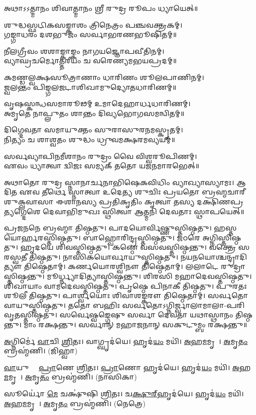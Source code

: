 
𑌅𑌥𑌾𑌽𑌽𑌤𑍍𑌮𑌾𑌨𑌂 𑌶𑌿𑌵𑌾𑌤𑍍𑌮𑌾𑌨𑌂 𑌶𑍍𑌰𑍀 𑌰𑍁𑌦𑍍𑌰 𑌰𑍂𑌪𑌂 𑌧𑍍𑌯𑌾𑌯𑍇𑌤𑍍॥

𑌶𑍁𑌦𑍍𑌧𑌸𑍍𑌫𑌟𑌿𑌕𑌸𑌙𑍍𑌕𑌾𑌶𑌂 𑌤𑍍𑌰𑌿𑌨𑍇𑌤𑍍𑌰𑌂 𑌪𑌞𑍍𑌚𑌵𑌕𑍍𑌤𑍍𑌰𑌕𑌮𑍍।\\
𑌗𑌙𑍍𑌗𑌾𑌧𑌰𑌂 𑌦𑌶𑌭𑍁𑌜𑌂 𑌸𑌰𑍍𑌵𑌾𑌭𑌰𑌣𑌭𑍂𑌷𑌿𑌤𑌮𑍍॥

𑌨𑍀𑌲𑌗𑍍𑌰𑍀𑌵𑌂 𑌶𑌶𑌾𑌙𑍍𑌕𑌾𑌙𑍍𑌕𑌂 𑌨𑌾𑌗𑌯𑌜𑍍𑌞𑍋𑌪𑌵𑍀𑌤𑌿𑌨𑌮𑍍।\\
𑌵𑍍𑌯𑌾𑌘𑍍𑌰𑌚𑌰𑍍𑌮𑍋𑌤𑍍𑌤𑌰𑍀𑌯𑌂 𑌚 𑌵𑌰𑍇𑌣𑍍𑌯𑌮𑌭𑌯𑌪𑍍𑌰𑌦𑌮𑍍॥

𑌕𑌮𑌣𑍍𑌡𑌲𑍍𑌵𑌕𑍍𑌷𑌸𑍂𑌤𑍍𑌰𑌾𑌣𑌾𑌂 𑌧𑌾𑌰𑌿𑌣𑌂 𑌶𑍂𑌲𑌪𑌾𑌣𑌿𑌨𑌮𑍍।\\
𑌜𑍍𑌵𑌲𑌨𑍍𑌤𑌂 𑌪𑌿𑌙𑍍𑌗𑌲𑌜𑌟𑌾𑌶𑌿𑌖𑌾𑌮𑍁𑌦𑍍𑌯𑍋𑌤𑌧𑌾𑌰𑌿𑌣𑌮𑍍॥

𑌵𑍃𑌷𑌸𑍍𑌕𑌨𑍍𑌧𑌸𑌮𑌾𑌰𑍂𑌢𑌮𑍍 𑌉𑌮𑌾𑌦𑍇𑌹𑌾𑌰𑍍𑌧𑌧𑌾𑌰𑌿𑌣𑌮𑍍।\\
𑌅𑌮𑍃𑌤𑍇  𑌨𑌾𑌪𑍍𑌲𑍁𑌤𑌂 𑌶𑌾𑌨𑍍𑌤𑌂 𑌦𑌿𑌵𑍍𑌯𑌭𑍋𑌗𑌸𑌮𑌨𑍍𑌵𑌿𑌤𑌮𑍍॥

𑌦𑌿𑌗𑍍𑌦𑍇𑌵𑌤𑌾 𑌸𑌮𑌾𑌯𑍁𑌕𑍍𑌤𑌂 𑌸𑍁𑌰𑌾𑌸𑍁𑌰𑌨𑌮𑌸𑍍𑌕𑍃𑌤𑌮𑍍।\\
𑌨𑌿𑌤𑍍𑌯𑌂 𑌚 𑌶𑌾𑌶𑍍𑌵𑌤𑌂 𑌶𑍁𑌦𑍍𑌧𑌂 𑌧𑍍𑌰𑍁𑌵𑌮𑌕𑍍𑌷𑌰𑌮𑌵𑍍𑌯𑌯𑌮𑍍॥

𑌸𑌰𑍍𑌵𑌵𑍍𑌯𑌾𑌪𑌿𑌨𑌮𑍀𑌶𑌾𑌨𑌂 𑌰𑍁𑌦𑍍𑌰𑌂 𑌵𑍈 𑌵𑌿𑌶𑍍𑌵𑌰𑍂𑌪𑌿𑌣𑌮𑍍।\\
𑌏𑌵𑌂 𑌧𑍍𑌯𑌾𑌤𑍍𑌵𑌾 𑌦𑍍𑌵𑌿𑌜𑌃 𑌸𑌮𑍍𑌯𑌕𑍍 𑌤𑌤𑍋 𑌯𑌜𑌨𑌮𑌾𑌰𑌭𑍇𑌤𑍍॥

𑌅𑌥𑌾𑌤𑍋 𑌰𑍁𑌦𑍍𑌰 𑌸𑍍𑌨𑌾𑌨𑌾𑌰𑍍𑌚𑌨𑌾𑌭𑌿𑌷𑍇𑌕𑌵𑌿𑌧𑌿𑌂 𑌵𑍍𑌯𑌾𑌖𑍍𑌯𑌾𑌸𑍍𑌯𑌾𑌮𑌃। 𑌆𑌦𑌿𑌤 𑌏𑌵 𑌤𑍀𑌰𑍍𑌥𑍇 𑌸𑍍𑌨𑌾𑌤𑍍𑌵𑌾 𑌉𑌦𑍇𑌤𑍍𑌯 𑌶𑍁𑌚𑌿𑌃
𑌪𑍍𑌰𑌯𑌤𑍋 𑌬𑍍𑌰𑌹𑍍𑌮𑌚𑌾𑌰𑍀 𑌶𑍁𑌕𑍍𑌲𑌵𑌾𑌸𑌾 𑌈𑌶𑌾𑌨𑌸𑍍𑌯 𑌪𑍍𑌰𑌤𑌿𑌕𑍃𑌤𑌿𑌂 𑌕𑍃𑌤𑍍𑌵𑌾 𑌤𑌸𑍍𑌯 𑌦𑌕𑍍𑌷𑌿𑌣𑌪𑍍𑌰𑌤𑍍𑌯𑌗𑍍𑌦𑍇𑌶𑍇 𑌦𑍇𑌵𑌾𑌭𑌿𑌮𑍁𑌖𑌃 𑌸𑍍𑌥𑌿𑌤𑍍𑌵𑌾 𑌆𑌤𑍍𑌮𑌨𑌿 𑌦𑍇𑌵𑌤𑌾𑌃 𑌸𑍍𑌥𑌾𑌪𑌯𑍇𑌤𑍍॥

𑌪𑍍𑌰𑌜𑌨𑌨𑍇 𑌬𑍍𑌰𑌹𑍍𑌮𑌾 𑌤𑌿𑌷𑍍𑌠𑌤𑍁। 𑌪𑌾𑌦𑌯𑍋𑌰𑍍𑌵𑌿𑌷𑍍𑌣𑍁𑌸𑍍𑌤𑌿𑌷𑍍𑌠𑌤𑍁। 
𑌹𑌸𑍍𑌤𑌯𑍋𑌰𑍍𑌹𑌰𑌸𑍍𑌤𑌿𑌷𑍍𑌠𑌤𑍁। 𑌬𑌾𑌹𑍍𑌵𑍋𑌰𑌿𑌨𑍍𑌦𑍍𑌰𑌸𑍍𑌤𑌿𑌷𑍍𑌠𑌤𑍁। 
𑌜𑌠𑌰𑍇 𑌅𑌗𑍍𑌨𑌿𑌸𑍍𑌤𑌿𑌷𑍍𑌠𑌤𑍁। 𑌹𑍃𑌦𑌯𑍇 𑌶𑌿𑌵𑌸𑍍𑌤𑌿𑌷𑍍𑌠𑌤𑍁। 
𑌕𑌣𑍍𑌠𑍇 𑌵𑌸𑌵𑌸𑍍𑌤𑌿𑌷𑍍𑌠𑌨𑍍𑌤𑍁। 𑌵𑌕𑍍𑌤𑍍𑌰𑍇 𑌸𑌰𑌸𑍍𑌵𑌤𑍀 𑌤𑌿𑌷𑍍𑌠𑌤𑍁। 
𑌨𑌾𑌸𑌿𑌕𑌯𑍋𑌰𑍍\-𑌵𑌾𑌯𑍁𑌸𑍍𑌤𑌿𑌷𑍍𑌠𑌤𑍁। 𑌨𑌯𑌨𑌯𑍋𑌶𑍍𑌚𑌨𑍍𑌦𑍍𑌰𑌾𑌦𑌿𑌤𑍍𑌯𑍗 𑌤𑌿𑌷𑍍𑌠𑍇𑌤𑌾𑌮𑍍। 
𑌕𑌰𑍍𑌣𑌯𑍋𑌰𑌶𑍍𑌵𑌿𑌨𑍗 𑌤𑌿𑌷𑍍𑌠𑍇𑌤𑌾𑌮𑍍। 𑌲𑌲𑌾𑌟𑍇 𑌰𑍁𑌦𑍍𑌰𑌾𑌸𑍍𑌤𑌿𑌷𑍍𑌠𑌨𑍍𑌤𑍁। 
𑌮𑍂𑌰𑍍𑌧𑍍𑌨𑍍𑌯𑌾𑌦𑌿𑌤𑍍𑌯𑌾𑌸𑍍𑌤𑌿𑌷𑍍𑌠𑌨𑍍𑌤𑍁। 𑌶𑌿𑌰𑌸𑌿 𑌮𑌹𑌾𑌦𑍇𑌵𑌸𑍍𑌤𑌿𑌷𑍍𑌠𑌤𑍁। 
𑌶𑌿𑌖𑌾𑌯𑌾𑌂 𑌵𑌾𑌮𑌦𑍇𑌵𑌸𑍍𑌤𑌿𑌷𑍍𑌠𑌤𑍁। 𑌪𑍃𑌷𑍍𑌠𑍇 𑌪𑌿𑌨𑌾𑌕𑍀 𑌤𑌿𑌷𑍍𑌠𑌤𑍁। 
𑌪𑍁𑌰𑌤𑌃 𑌶𑍂𑌲𑍀 𑌤𑌿𑌷𑍍𑌠𑌤𑍁। 𑌪𑌾𑌰𑍍𑌶𑍍𑌵𑌯𑍋𑌃 𑌶𑌿𑌵𑌾𑌶𑌙𑍍𑌕𑌰𑍗 𑌤𑌿𑌷𑍍𑌠𑍇𑌤𑌾𑌮𑍍। 
𑌸𑌰𑍍𑌵𑌤𑍋 𑌵𑌾𑌯𑍁𑌸𑍍𑌤𑌿𑌷𑍍𑌠𑌤𑍁। 𑌤𑌤𑍋 𑌬𑌹𑌿𑌃 𑌸𑌰𑍍𑌵𑌤𑍋𑌽𑌗𑍍𑌨𑌿𑌰𑍍𑌜𑍍𑌵𑌾𑌲𑌾𑌮𑌾𑌲𑌾-𑌪𑌰𑌿𑌵𑍃𑌤𑌸𑍍𑌤𑌿𑌷𑍍𑌠𑌤𑍁।
𑌸𑌰𑍍𑌵𑍇𑌷𑍍𑌵𑌙𑍍𑌗𑍇𑌷𑍁 𑌸𑌰𑍍𑌵𑌾 𑌦𑍇𑌵𑌤𑌾 𑌯𑌥𑌾𑌸𑍍𑌥𑌾𑌨𑌂 𑌤𑌿𑌷𑍍𑌠𑌨𑍍𑌤𑍁। 𑌮𑌾𑌂 𑌰𑌕𑍍𑌷𑌨𑍍𑌤𑍁।
\lbrack 𑌸𑌰𑍍𑌵𑌾𑌨𑍍 𑌮𑌹𑌾𑌜𑌨𑌾𑌨𑍍 𑌸𑌕𑍁𑌟𑍁𑌮𑍍𑌬𑌂 𑌰𑌕𑍍𑌷𑌨𑍍𑌤𑍁॥\rbrack

\ul{𑌅}𑌗𑍍𑌨𑌿𑌰𑍍𑌮𑍇॑ \ul{𑌵𑌾}𑌚𑌿 \ul{𑌶𑍍𑌰𑌿}𑌤𑌃।   𑌵𑌾𑌗𑍍𑌘𑍃𑌦॑𑌯𑍇।   𑌹𑍃𑌦॑\ul{𑌯𑌂} 𑌮𑌯𑌿॑।   \ul{𑌅}𑌹\ul{𑌮}𑌮𑍃𑌤𑍇᳚।   \ul{𑌅}𑌮𑍃\ul{𑌤𑌂} 𑌬𑍍𑌰𑌹𑍍𑌮॑𑌣𑌿। (𑌜𑌿𑌹𑍍𑌵𑌾)

 \ul{𑌵𑌾}𑌯𑍁𑌰𑍍𑌮𑍇᳚ \ul{𑌪𑍍𑌰𑌾}𑌣𑍇 \ul{𑌶𑍍𑌰𑌿}𑌤𑌃।   \ul{𑌪𑍍𑌰𑌾}𑌣𑍋 𑌹𑍃𑌦॑𑌯𑍇।   𑌹𑍃𑌦॑\ul{𑌯𑌂} 𑌮𑌯𑌿॑।   \ul{𑌅}𑌹\ul{𑌮}𑌮𑍃𑌤𑍇᳚।   \ul{𑌅}𑌮𑍃\ul{𑌤𑌂} 𑌬𑍍𑌰𑌹𑍍𑌮॑𑌣𑌿। (𑌨𑌾𑌸𑌿𑌕𑌾)

   𑌸𑍂𑌰𑍍𑌯𑍋॑ \ul{𑌮𑍇} 𑌚𑌕𑍍𑌷𑍁॑𑌷𑌿 \ul{𑌶𑍍𑌰𑌿}𑌤𑌃।   𑌚\ul{𑌕𑍍𑌷𑍁}\ul{𑌰𑍍}‌𑌹𑍃𑌦॑𑌯𑍇।   𑌹𑍃𑌦॑\ul{𑌯𑌂} 𑌮𑌯𑌿॑।   \ul{𑌅}𑌹\ul{𑌮}𑌮𑍃𑌤𑍇᳚।   \ul{𑌅}𑌮𑍃\ul{𑌤𑌂} 𑌬𑍍𑌰𑌹𑍍𑌮॑𑌣𑌿। (𑌨𑍇𑌤𑍍𑌰𑍇)

